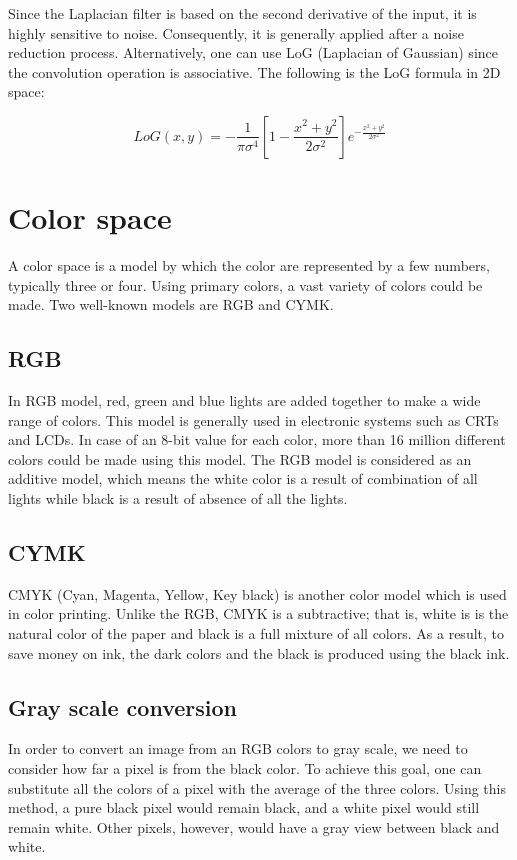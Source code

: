 \documentclass{article}
\begin{document}
			 Since the Laplacian filter is based on the second derivative of the input, it is highly sensitive to noise. Consequently,
			it is generally applied after a noise reduction process. Alternatively, one can use LoG (Laplacian of Gaussian) since the convolution operation is
			associative. The following is the LoG formula in 2D space:

\begin{equation}
			LoG(x,y) = -\frac{1}{\pi\sigma^{4}}[1-\frac{x^{2}+y^{2}}{2\sigma^{2}}]e^{-\frac{x^{2}+y^{2}}{2\sigma^{2}}}
\end{equation}


\section{Color space}    
	A color space is a model by which the color are represented by a few numbers, typically three or four. Using primary colors, a vast variety of colors could be made. Two well-known models are RGB and CYMK.      

	\subsection{RGB}
		In RGB model, red, green and blue lights are added together to make a wide range of colors. This model is generally used in electronic systems such as CRTs and LCDs. In case of an 8-bit value for each color, more than 16 million different colors
		could be made using this model. The RGB model is considered as an additive model, which means the white color is a result of combination of all lights while black is a result of absence of all the lights.
	

	\subsection{CYMK}

		CMYK (Cyan, Magenta, Yellow, Key black) is another color model which is used in color printing. Unlike the RGB, CMYK is a subtractive; that is, white is is the natural color of the paper and black is a full mixture of all colors.
		As a result, to save money on ink, the dark colors and the black is produced using the black ink.

	\subsection{Gray scale conversion}

		In order to convert an image from an RGB colors to gray scale, we need to consider how far a pixel is from the black color. To achieve this goal, one can substitute all the colors of a pixel with the average of the three colors. Using this method, a pure black pixel would remain black, and a white pixel would still remain white. Other pixels, however, would have a gray view between black and white.
\end{document}
